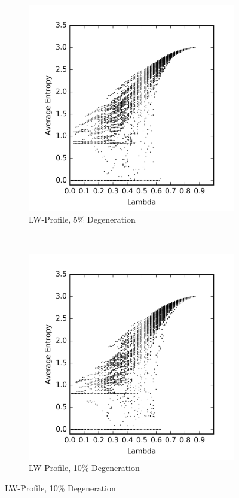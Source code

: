 \documentclass[a4paper,11pt,twoside]{report}
\begin{document}
\begin{figure}[htp]
\centering
\begin{subfigure}[t]{0.4\textwidth}
  \includegraphics[width=\textwidth]{ch6_figs/degen_stoma_5}
  \caption{LW-Profile, 5\% Degeneration}
  \label{fig:lw_degen_pt_5}
\end{subfigure}
~
\begin{subfigure}[t]{0.4\textwidth}
  \centering
  \includegraphics[width=\textwidth]{ch6_figs/degen_stoma_10}
  \caption{LW-Profile, 10\% Degeneration}
  \label{fig:lw_degen_pt_10}
  \end{subfigure}


\end{figure}
\end{document}
